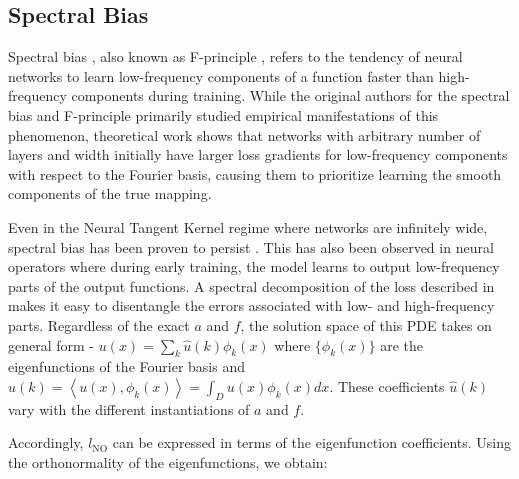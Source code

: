 \documentclass[12pt]{article}
\begin{document}


\subsection{Spectral Bias}

Spectral bias \autocite{rahaman2019spectral}, also known as F-principle \autocite{xu2019frequency}, refers to the tendency of neural networks to learn low-frequency components of a function faster than high-frequency components during training. While the original authors for the spectral bias and F-principle primarily studied empirical manifestations of this phenomenon, theoretical work \autocite{luo2019theory} shows that networks with arbitrary number of layers and width initially have larger loss gradients for low-frequency components with respect to the Fourier basis, causing them to prioritize learning the smooth components of the true mapping. 

Even in the Neural Tangent Kernel regime where networks are infinitely wide, spectral bias has been proven to persist \autocite{cao2019towards}. This has also been observed in neural operators \autocite{liu2021multiscale,liu2024mitigating,you2024mscalefno,khodakarami2025mitigating,xu2025understanding} where during early training, the model learns to output low-frequency parts of the output functions. A spectral decomposition of the loss described in  makes it easy to disentangle the errors associated with low- and high-frequency parts. Regardless of the exact $a$ and $f$, the solution space of this PDE takes on general form - $u(x) = \sum_{k}\widehat{u}(k) \phi_k(x)$ where $\{\phi_k(x)\}$ are the eigenfunctions of the Fourier basis and $\widehat{u}(k) = \left<u(x), \phi_k(x)\right> = \int_D u(x)\phi_k(x)dx$. These coefficients $\widehat{u}(k)$ vary with the different instantiations of $a$ and $f$. 

Accordingly, $l_{\text{NO}}$ can be expressed in terms of the eigenfunction coefficients. Using the orthonormality of the eigenfunctions, we obtain:
\end{document}
